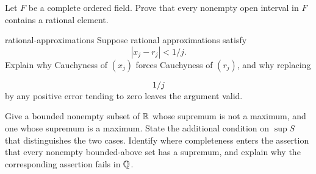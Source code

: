 \begin{exercise}
Let $F$ be a complete ordered field. Prove that every nonempty open interval in $F$ contains a rational element.
\end{exercise}

\begin{hexercise}{rational-approximations}
Suppose rational approximations satisfy
\[
|x_j-r_j|<1/j.
\]
 Explain why
Cauchyness of $(x_j)$ forces Cauchyness of $(r_j)$, and why replacing

\[
1/j
\]
 by any positive error tending to zero leaves the argument valid.
\end{hexercise}

\begin{exercise}
Give a bounded nonempty subset of $\mathbb{R}$ whose supremum is not a maximum,
and one whose supremum is a maximum. State the additional condition on
$\sup S$ that distinguishes the two cases. Identify where completeness
enters the assertion that every nonempty bounded-above set has a supremum,
and explain why the corresponding assertion fails in $\mathbb{Q}$.
\end{exercise}
